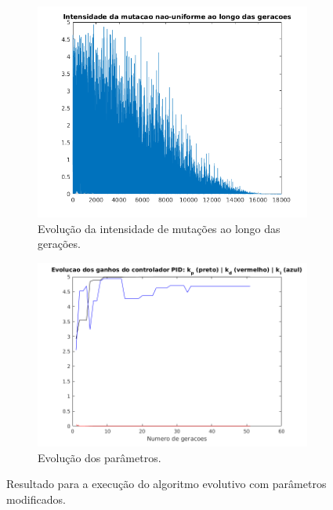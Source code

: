 \begin {enumerate}
\begin{figure}[h!]
		\begin{subfigure}{.5\textwidth}
		  \centering
		  \includegraphics[width=1\linewidth]{pid/mutacao_pid_ex_c_mod}
		  \caption{\centering Evolução da intensidade de mutações ao longo das
		  gerações.}
		  \label{fig:pid_mutacao_c_mod}
		\end{subfigure}%
		\begin{subfigure}{.5\textwidth}
		  \centering
		  \includegraphics[width=1\linewidth]{pid/kp_kd_ki_pid_ex_c_mod}
		  \caption{\centering Evolução dos parâmetros.}
		  \label{fig:pid_parametros_c_mod} 
		\end{subfigure}
	
	\caption{Resultado para a execução do algoritmo evolutivo com parâmetros
	modificados.}
	\end{figure}


\end{enumerate}

